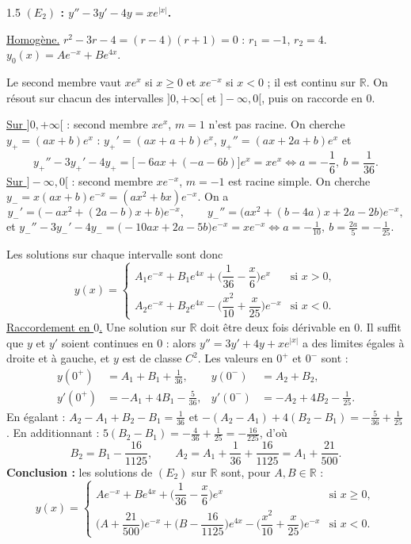 \documentclass[12pt]{article}
\begin{document}
\begin{spacing}{1.5}
\textbf{$(E_2)$ : $y''-3y'-4y=xe^{|x|}$.}

\underline{Homogène.} $r^2-3r-4=(r-4)(r+1)=0$ : $r_1=-1$, $r_2=4$. $y_0(x)=Ae^{-x}+Be^{4x}$.

Le second membre vaut $xe^{x}$ si $x\ge0$ et $xe^{-x}$ si $x<0$ ; il est continu sur $\mathbb{R}$. On résout sur chacun des intervalles $]0,+\infty[$ et $]-\infty,0[$, puis on raccorde en $0$.

\underline{Sur $]0,+\infty[$} : second membre $xe^x$, $m=1$ n'est pas racine. On cherche $y_+=(ax+b)e^x$ : $y_+'=(ax+a+b)e^x$, $y_+''=(ax+2a+b)e^x$ et
\[
y_+''-3y_+'-4y_+=\big[-6ax+(-a-6b)\big]e^x=xe^x\iff a=-\frac16,\ b=\frac1{36}.
\]
\underline{Sur $]-\infty,0[$} : second membre $xe^{-x}$, $m=-1$ est racine simple. On cherche $y_-=x(ax+b)e^{-x}=(ax^2+bx)e^{-x}$. On a
\[
y_-'=\big(-ax^2+(2a-b)x+b\big)e^{-x},\qquad y_-''=\big(ax^2+(b-4a)x+2a-2b\big)e^{-x},
\]
et $y_-''-3y_-'-4y_-=\big(-10ax+2a-5b\big)e^{-x}=xe^{-x}\iff a=-\frac1{10},\ b=\frac{2a}{5}=-\frac1{25}$.

Les solutions sur chaque intervalle sont donc
\[
y(x)=\begin{cases}
A_1e^{-x}+B_1e^{4x}+\Big(\dfrac1{36}-\dfrac x6\Big)e^x & \text{si } x>0,\\[3mm]
A_2e^{-x}+B_2e^{4x}-\Big(\dfrac{x^2}{10}+\dfrac{x}{25}\Big)e^{-x} & \text{si } x<0.
\end{cases}
\]
\underline{Raccordement en $0$.} Une solution sur $\mathbb{R}$ doit être deux fois dérivable en $0$. Il suffit que $y$ et $y'$ soient continues en $0$ : alors $y''=3y'+4y+xe^{|x|}$ a des limites égales à droite et à gauche, et $y$ est de classe $C^2$. Les valeurs en $0^+$ et $0^-$ sont :
\begin{align*}
y(0^+)&=A_1+B_1+\tfrac1{36}, & y(0^-)&=A_2+B_2,\\
y'(0^+)&=-A_1+4B_1-\tfrac5{36}, & y'(0^-)&=-A_2+4B_2-\tfrac1{25}.
\end{align*}
En égalant : $A_2-A_1+B_2-B_1=\frac1{36}$ et $-(A_2-A_1)+4(B_2-B_1)=-\frac5{36}+\frac1{25}$. En additionnant : $5(B_2-B_1)=-\frac4{36}+\frac1{25}=-\frac{16}{225}$, d'où
\[
B_2=B_1-\frac{16}{1125},\qquad A_2=A_1+\frac1{36}+\frac{16}{1125}=A_1+\frac{21}{500}.
\]
\textbf{Conclusion :} les solutions de $(E_2)$ sur $\mathbb{R}$ sont, pour $A,B\in\mathbb{R}$ :
\[
y(x)=\begin{cases}
Ae^{-x}+Be^{4x}+\Big(\dfrac1{36}-\dfrac x6\Big)e^x & \text{si } x\ge0,\\[3mm]
\Big(A+\dfrac{21}{500}\Big)e^{-x}+\Big(B-\dfrac{16}{1125}\Big)e^{4x}-\Big(\dfrac{x^2}{10}+\dfrac{x}{25}\Big)e^{-x} & \text{si } x<0.
\end{cases}
\]


\end{spacing}
\end{document}
